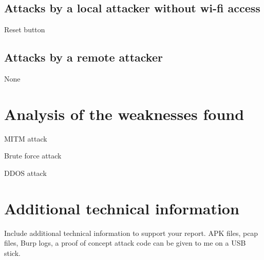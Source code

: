 \documentclass[11pt]{article}
\begin{document}
\subsection{Attacks by a local attacker without wi-fi access}

Reset button

\subsection{Attacks by a remote attacker}

None

\section{Analysis of the weaknesses found}

MITM attack

Brute force attack

DDOS attack

\appendix

\section{Additional technical information}

Include additional technical information to support your report. APK files,
pcap files, Burp logs, a proof of concept attack code can be given to me on a
USB stick.
\end{document}

